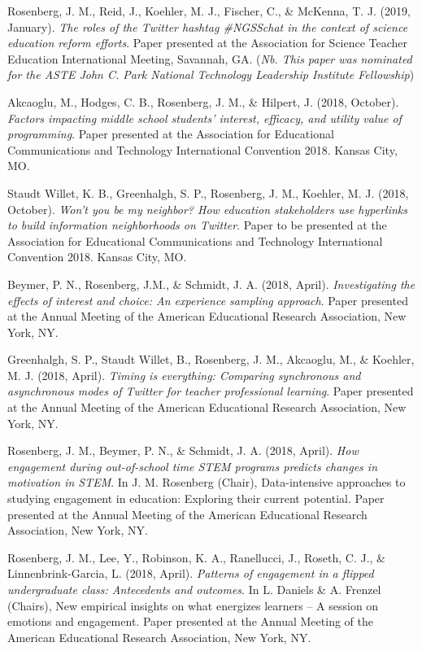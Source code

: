 \documentclass[14,]{article}
\begin{document}
Rosenberg, J. M., Reid, J., Koehler, M. J., Fischer, C., \& McKenna, T.
J. (2019, January). \emph{The roles of the Twitter hashtag \#NGSSchat in
the context of science education reform efforts}. Paper presented at the
Association for Science Teacher Education International Meeting,
Savannah, GA. (\emph{Nb. This paper was nominated for the ASTE John C.
Park National Technology Leadership Institute Fellowship})

Akcaoglu, M., Hodges, C. B., Rosenberg, J. M., \& Hilpert, J. (2018,
October). \emph{Factors impacting middle school students' interest,
efficacy, and utility value of programming}. Paper presented at the
Association for Educational Communications and Technology International
Convention 2018. Kansas City, MO.

Staudt Willet, K. B., Greenhalgh, S. P., Rosenberg, J. M., Koehler, M.
J. (2018, October). \emph{Won't you be my neighbor? How education
stakeholders use hyperlinks to build information neighborhoods on
Twitter}. Paper to be presented at the Association for Educational
Communications and Technology International Convention 2018. Kansas
City, MO.

Beymer, P. N., Rosenberg, J.M., \& Schmidt, J. A. (2018, April).
\emph{Investigating the effects of interest and choice: An experience
sampling approach}. Paper presented at the Annual Meeting of the
American Educational Research Association, New York, NY.

Greenhalgh, S. P., Staudt Willet, B., Rosenberg, J. M., Akcaoglu, M., \&
Koehler, M. J. (2018, April). \emph{Timing is everything: Comparing
synchronous and asynchronous modes of Twitter for teacher professional
learning}. Paper presented at the Annual Meeting of the American
Educational Research Association, New York, NY.

Rosenberg, J. M., Beymer, P. N., \& Schmidt, J. A. (2018, April).
\emph{How engagement during out-of-school time STEM programs predicts
changes in motivation in STEM}. In J. M. Rosenberg (Chair),
Data-intensive approaches to studying engagement in education: Exploring
their current potential. Paper presented at the Annual Meeting of the
American Educational Research Association, New York, NY.

Rosenberg, J. M., Lee, Y., Robinson, K. A., Ranellucci, J., Roseth, C.
J., \& Linnenbrink-Garcia, L. (2018, April). \emph{Patterns of
engagement in a flipped undergraduate class: Antecedents and outcomes}.
In L. Daniels \& A. Frenzel (Chairs), New empirical insights on what
energizes learners -- A session on emotions and engagement. Paper
presented at the Annual Meeting of the American Educational Research
Association, New York, NY.
\end{document}
